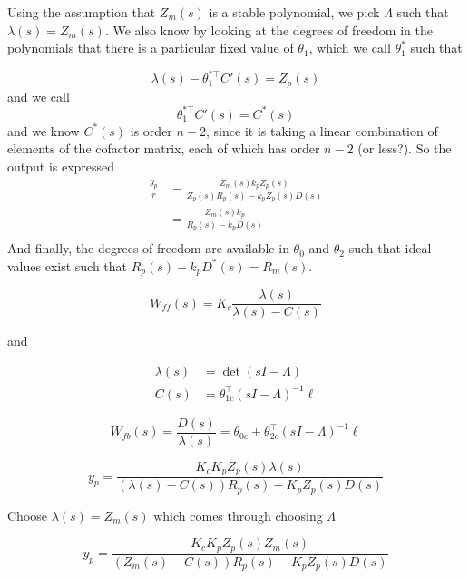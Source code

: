 Using the assumption that $Z_{m}(s)$ is a stable polynomial, we pick $\Lambda$ such that $\lambda(s)=Z_{m}(s)$.
We also know by looking at the degrees of freedom in the polynomials that there is a particular fixed value of $\theta_{1}$, which we call $\theta_{1}^{*}$ such that

\begin{equation*}
  \lambda(s)-\theta_{1}^{*\top}C'(s)=Z_{p}(s)
\end{equation*}
and we call
\begin{equation*}
  \theta_{1}^{*\top}C'(s)=C^{*}(s)
\end{equation*}
and we know $C^{*}(s)$ is order $n-2$, since it is taking a linear combination of elements of the cofactor matrix, each of which has order $n-2$ (or less?).
So the output is expressed
\begin{align*}
  \frac{y_{p}}{r}&=\frac{Z_{m}(s)k_{p}Z_{p}(s)}{Z_{p}(s)R_{p}(s)-k_{p}Z_{p}(s)D(s)} \\
  &=\frac{Z_{m}(s)k_{p}}{R_{p}(s)-k_{p}D(s)} \\
\end{align*}
And finally, the degrees of freedom are available in $\theta_{0}$ and $\theta_{2}$ such that ideal values exist such that $R_{p}(s)-k_{p}D^{*}(s)=R_{m}(s)$.

\begin{equation*}
  W_{ff}(s)=K_{c}\frac{\lambda(s)}{\lambda(s)-C(s)}
\end{equation*}

and

\begin{align*}
  \lambda(s)&=\det(sI-\Lambda) \\
  C(s)&=\theta_{1c}^{\top}(sI-\Lambda)^{-1}\ell
\end{align*}

\begin{equation*}
  W_{fb}(s)=\frac{D(s)}{\lambda(s)}=\theta_{0c}+\theta_{2c}^{\top}(sI-\Lambda)^{-1}\ell
\end{equation*}

\begin{equation*}
  y_{p}=\frac{K_{c}K_{p}Z_{p}(s)\lambda(s)}{(\lambda(s)-C(s))R_{p}(s)-K_{p}Z_{p}(s)D(s)}
\end{equation*}

Choose $\lambda(s)=Z_{m}(s)$ which comes through choosing $\Lambda$

\begin{equation*}
  y_{p}=\frac{K_{c}K_{p}Z_{p}(s)Z_{m}(s)}{(Z_{m}(s)-C(s))R_{p}(s)-K_{p}Z_{p}(s)D(s)}
\end{equation*}

